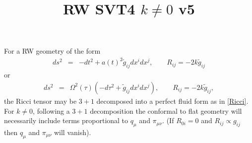 \documentclass[10pt,letterpaper]{article}
\title{RW SVT4 $k\ne 0$ v5}
\date{}
\numberwithin{equation}{section}
\begin{document}
 
\maketitle
\noindent 
For a RW geometry of the form
\begin{eqnarray}
ds^2 &=& -dt^2 + a(t)^2 \tilde g_{ij} dx^i dx^j,\qquad R_{ij} = -2k \tilde g_{ij}
\end{eqnarray}
or 
\begin{eqnarray}
ds^2 &=& \Omega^2(\tau)\left(-d\tau^2 +\tilde g_{ij} dx^i dx^j\right),\qquad R_{ij} = -2k \tilde g_{ij},
\end{eqnarray}
the Ricci tensor may be $3+1$ decomposed into a perfect fluid form as in \eqref{Ricci}. For $k\ne 0$, following a $3+1$ decomposition the conformal to flat geometry will necessarily include terms proportional to $q_\mu$ and $\pi_{\mu\nu}$. (If $R_{0i}=0$ and $R_{ij}\propto g_{ij}$ then $q_\mu$ and $\pi_{\mu\nu}$ will vanish).
\end{document}
